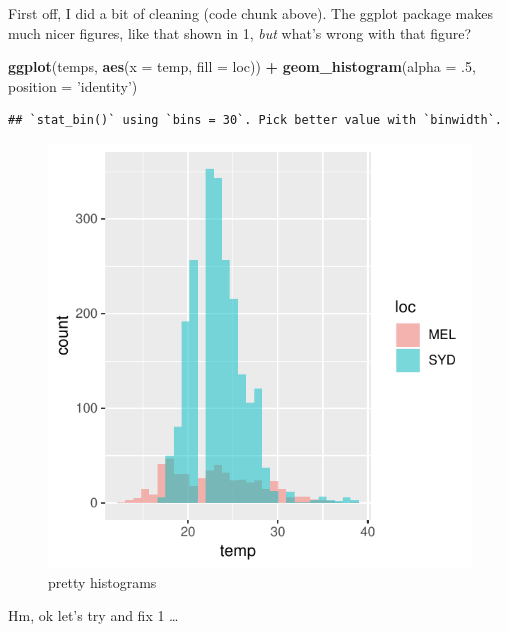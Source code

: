 \documentclass[]{article}
\newenvironment{Shaded}{\begin{snugshade}}{\end{snugshade}}
\newcommand{\DataTypeTok}[1]{\textcolor[rgb]{0.13,0.29,0.53}{#1}}
\newcommand{\FloatTok}[1]{\textcolor[rgb]{0.00,0.00,0.81}{#1}}
\newcommand{\KeywordTok}[1]{\textcolor[rgb]{0.13,0.29,0.53}{\textbf{#1}}}
\newcommand{\NormalTok}[1]{#1}
\newcommand{\OperatorTok}[1]{\textcolor[rgb]{0.81,0.36,0.00}{\textbf{#1}}}
\newcommand{\StringTok}[1]{\textcolor[rgb]{0.31,0.60,0.02}{#1}}
\begin{document}
First off, I did a bit of cleaning (code chunk above). The ggplot
package makes much nicer figures, like that shown in 1, \emph{but}
what's wrong with that figure?

\begin{Shaded}
\begin{Highlighting}[]
\KeywordTok{ggplot}\NormalTok{(temps, }\KeywordTok{aes}\NormalTok{(}\DataTypeTok{x =}\NormalTok{ temp, }\DataTypeTok{fill =}\NormalTok{ loc)) }\OperatorTok{+}\StringTok{ }\KeywordTok{geom_histogram}\NormalTok{(}\DataTypeTok{alpha =} \FloatTok{.5}\NormalTok{, }\DataTypeTok{position =} \StringTok{'identity'}\NormalTok{) }
\end{Highlighting}
\end{Shaded}

\begin{verbatim}
## `stat_bin()` using `bins = 30`. Pick better value with `binwidth`.
\end{verbatim}

\begin{figure}
\centering
\includegraphics{AT2_template__medium__files/figure-latex/pretty histograms-1.pdf}
\caption{pretty histograms}
\end{figure}

Hm, ok let's try and fix 1 \ldots{}
\end{document}
